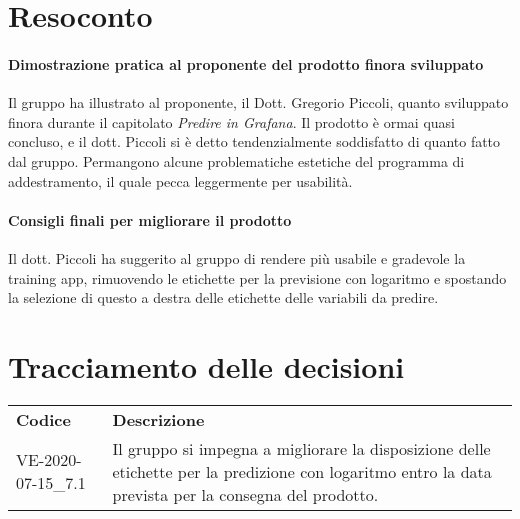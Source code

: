 \documentclass{article}
\begin{document}
\section{Resoconto}%
\label{resoconto}
\paragraph*{Dimostrazione pratica al proponente del prodotto finora sviluppato}
Il gruppo ha illustrato al proponente, il Dott. Gregorio Piccoli, quanto sviluppato finora durante il capitolato \emph{Predire in Grafana}. Il prodotto è 
ormai quasi concluso, e il dott. Piccoli si è detto tendenzialmente soddisfatto di quanto fatto dal gruppo. Permangono alcune problematiche estetiche 
del programma di addestramento, il quale pecca leggermente per usabilità.

\paragraph*{Consigli finali per migliorare il prodotto}
Il dott. Piccoli ha suggerito al gruppo di rendere più usabile e gradevole la training app, rimuovendo le etichette per la previsione con logaritmo e spostando 
la selezione di questo a destra delle etichette delle variabili da predire.

\section{Tracciamento delle decisioni}
\begin{table}[H]
  \centering
  \begin{tabular}{p{4cm}|p{12cm}}
    \rowcolor{lightgray}
    \textbf{Codice}  & \textbf{Descrizione}      \\
    VE-2020-07-15\_7.1 & Il gruppo si impegna a migliorare la disposizione delle etichette per la predizione con logaritmo entro la data prevista per la consegna del prodotto. \\
  \end{tabular}
\end{table}
\end{document}
